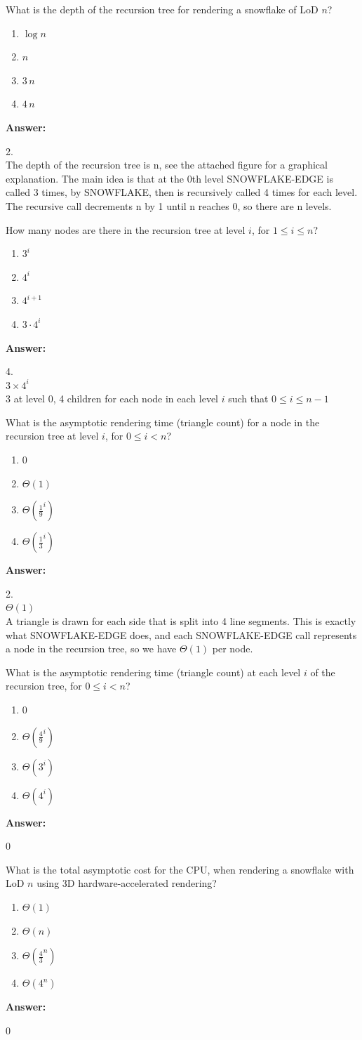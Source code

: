 \documentclass[12pt,twoside]{article}
\newcommand{\answer}{
 \par\medskip
 \textbf{Answer:}
}
\newcommand{\answerIa}{ \answer
2.
\\The depth of the recursion tree is n, see the attached figure for a graphical explanation.  The main idea is that at the 0th level SNOWFLAKE-EDGE is called 3 times, by SNOWFLAKE, then is recursively called 4 times for each level.  The recursive call decrements n by 1 until n reaches 0, so there are n levels.
}
\newcommand{\answerIb}{ \answer
4.
\\$3\times 4^i$
\\3 at level 0, 4 children for each node in each level $i$ such that $0\leq i \leq n-1$
}
\newcommand{\answerIc}{ \answer
2.\\
$\Theta(1)$\\
A triangle is drawn for each side that is split into 4 line segments.  This is exactly what SNOWFLAKE-EDGE does, and each SNOWFLAKE-EDGE call represents a node in the recursion tree, so we have $\Theta(1)$ per node.
}
\newcommand{\answerId}{ \answer
0
}
\newcommand{\answerIe}{ \answer
0
}
\begin{document}
\begin{problems}
\begin{problemparts}
  \problempart {} What is the depth of the recursion tree for rendering a
  snowflake of LoD $n$?
    \begin{enumerate}
      \item $\log n$
      \item $n$
      \item $3 \, n$
      \item $4 \, n$
    \end{enumerate}
\answerIa

  \problempart {} How many nodes are there in the recursion tree at level
  $i$, for $1 \le i \le n$?
    \begin{enumerate}
     \item $3 ^ i$
      \item $4 ^ i$
      \item $4 ^ {i + 1}$
      \item $3 \cdot 4 ^ i$
    \end{enumerate}
\answerIb
    
  \problempart {} What is the asymptotic rendering time (triangle count) for a
  node in the recursion tree at level $i$, for $0 \le i < n$?
    \begin{enumerate}
      \item $0$
      \item $\Theta(1)$
      \item $\Theta(\frac{1}{9}^i)$
      \item $\Theta(\frac{1}{3}^i)$
    \end{enumerate}
\answerIc 

  \problempart {} What is the asymptotic rendering time (triangle count) at
  each level $i$ of the recursion tree, for $0 \le i < n$?
    \begin{enumerate}
      \item 0
      \item $\Theta(\frac{4}{9} ^ i)$
      \item $\Theta(3 ^ i)$
      \item $\Theta(4 ^ i)$
    \end{enumerate}
\answerId

  \problempart {} What is the total asymptotic cost for the CPU, when rendering
  a snowflake with LoD $n$ using 3D hardware-accelerated rendering?
    \begin{enumerate}
      \item $\Theta(1)$
      \item $\Theta(n)$
      \item $\Theta(\frac{4}{3}^n)$
      \item $\Theta(4^n)$
    \end{enumerate}
\answerIe
\end{problemparts}


\end{problems}
\end{document}
